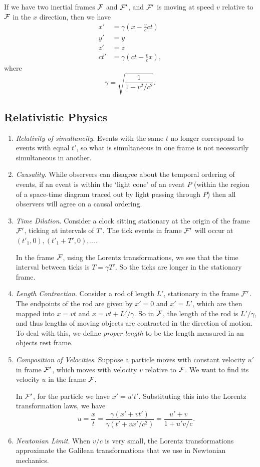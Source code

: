 \documentclass[11pt, a4paper]{scrartcl}
\theoremstyle{definition}
\begin{document}
If we have two inertial frames $\mathcal{F}$ and $\mathcal{F}'$, and $\mathcal{F}'$ is moving at speed $v$ relative to $\mathcal{F}$ in the $x$ direction, then we have
\begin{align*}
	x' &= \gamma \left(x - \frac{v}{c} ct\right) \\
	y' &= y \\
	z' &= z \\
	ct' &= \gamma\left(ct - \frac{v}{c}x\right),
\end{align*}  
where
$$
\gamma = \sqrt{\frac{1}{1 - v^2/c^2}}.
$$


\subsection*{Relativistic Physics}

\begin{enumerate}
	\item \emph{Relativity of simultaneity}. Events with the same $t$ no longer correspond to events with equal $t'$, so what is simultaneous in one frame is not necessarily simultaneous in another.
	\item \emph{Causality}. While observers can disagree about the temporal ordering of events, if an event is within the `light cone' of an event $P$ (within the region of a space-time diagram traced out by light passing through $P$) then all observers will agree on a causal ordering.  
	\item \emph{Time Dilation}. Consider a clock sitting stationary at the origin of the frame $\mathcal{F}'$, ticking at intervals of $T'$. The tick events in frame $\mathcal{F}'$ will occur at $(t'_1, 0), (t'_1 + T', 0), \dots$. 
	
	In the frame $\mathcal{F}$, using the Lorentz transformations, we see that the time interval between ticks is $T = \gamma T'$. So the ticks are longer in the stationary frame. 
	\item \emph{Length Contraction}. Consider a rod of length $L'$, stationary in the frame $\mathcal{F}'$. 
	The endpoints of the rod are given by $x' = 0$ and $x' = L'$, which are then mapped into $x = vt$ and $x = vt + L'/\gamma$. 
	So in $\mathcal{F}$, the length of the rod is $L'/\gamma$, and thus lengths of moving objects are contracted in the direction of motion. To deal with this, we define \emph{proper length} to be the length measured in an objects rest frame.
	\item \emph{Composition of Velocities}. Suppose a particle moves with constant velocity $u'$ in frame $\mathcal{F}'$, which moves with velocity $v$ relative to $\mathcal{F}$. We want to find its velocity $u$ in the frame $\mathcal{F}$.

	In $\mathcal{F}'$, for the particle we have $x' = u't'$. Substituting this into the Lorentz transformation laws, we have
	$$
	u = \frac{x}{t} = \frac{\gamma(x' + vt')}{\gamma(t' + vx'/c^2)} = \frac{u' + v}{1 + u' v/c}.
	$$
	\item \emph{Newtonian Limit}. When $v/c$ is very small, the Lorentz transformations approximate the Galilean transformations that we use in Newtonian mechanics.
\end{enumerate}
\end{document}
